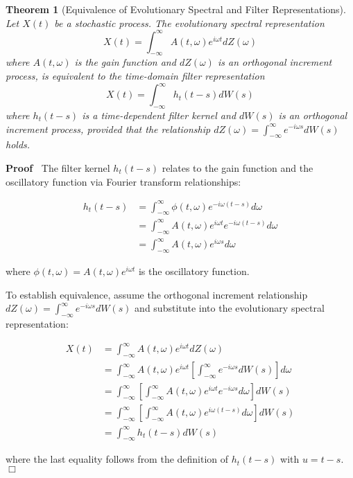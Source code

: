 \documentclass{article}
\newenvironment{proof}{\noindent\textbf{Proof\ }}{\hspace*{\fill}$\Box$\medskip}
\newtheorem{theorem}{Theorem}
\begin{document}
\begin{theorem}
  [Equivalence of Evolutionary Spectral and Filter Representations] Let $X
  (t)$ be a stochastic process. The evolutionary spectral representation
  \begin{equation}
    X (t) = \int_{- \infty}^{\infty} A (t, \omega) e^{i \omega t} dZ (\omega)
  \end{equation}
  where $A (t, \omega)$ is the gain function and $dZ (\omega)$ is an
  orthogonal increment process, is equivalent to the time-domain filter
  representation
  \begin{equation}
    X (t) = \int_{- \infty}^{\infty} h_t  (t - s) dW (s)
  \end{equation}
  where $h_t  (t - s)$ is a time-dependent filter kernel and $dW (s)$ is an
  orthogonal increment process, provided that the relationship $dZ (\omega) = \int_{- \infty}^{\infty} e^{- i \omega s} dW (s)$ holds.
\end{theorem}

\begin{proof}
  The filter kernel $h_t  (t - s)$ relates to the gain function and the
  oscillatory function via Fourier transform relationships:
  
  \begin{align}
    h_t  (t - s) & = \int_{- \infty}^{\infty} \phi (t, \omega) e^{- i \omega
    (t - s)} d \omega \\
    & = \int_{- \infty}^{\infty} A (t, \omega) e^{i \omega t} e^{- i \omega
    (t - s)} d \omega \\
    & = \int_{- \infty}^{\infty} A (t, \omega) e^{i \omega s} d \omega 
  \end{align}
  
  where $\phi (t, \omega) = A (t, \omega) e^{i \omega t}$ is the oscillatory
  function.
  
  To establish equivalence, assume the orthogonal increment relationship
  $dZ (\omega) = \int_{- \infty}^{\infty} e^{- i \omega s} dW (s)$ and substitute into the
  evolutionary spectral representation:
  
  \begin{align}
    X (t) & = \int_{- \infty}^{\infty} A (t, \omega) e^{i \omega t} dZ
    (\omega) \\
    & = \int_{- \infty}^{\infty} A (t, \omega) e^{i \omega t} \left[ \int_{-
    \infty}^{\infty} e^{- i \omega s} dW (s) \right] d \omega \\
    & = \int_{- \infty}^{\infty} \left[ \int_{- \infty}^{\infty} A (t,
    \omega) e^{i \omega t} e^{- i \omega s} d \omega \right] dW (s) \\
    & = \int_{- \infty}^{\infty} \left[ \int_{- \infty}^{\infty} A (t,
    \omega) e^{i \omega (t - s)} d \omega \right] dW (s) \\
    & = \int_{- \infty}^{\infty} h_t  (t - s) dW (s) 
  \end{align}
  
  where the last equality follows from the definition of $h_t  (t - s)$ with
  $u = t - s$.
\end{proof}
\end{document}

